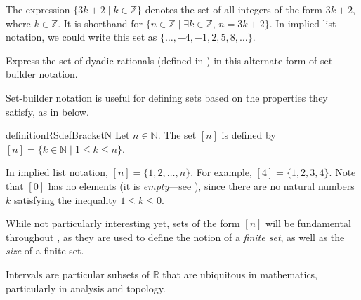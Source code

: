 \begin{example}
The expression $\{ 3k+2 \mid k \in \mathbb{Z} \}$ denotes the set of all integers of the form $3k+2$, where $k \in \mathbb{Z}$. It is shorthand for $\{ n \in \mathbb{Z} \mid \exists k \in \mathbb{Z},\, n=3k+2 \}$. In implied list notation, we could write this set as $\{ \dots, {-4}, {-1}, 2, 5, 8, \dots \}$.
\end{example}

\begin{exercise}
Express the set of dyadic rationals (defined in ) in this alternate form of set-builder notation.
\end{exercise}

Set-builder notation is useful for defining sets based on the properties they satisfy, as in  below.

\begin{restatable}{definition}{RSdefBracketN}
\label{defBracketN}
Let $n \in \mathbb{N}$. The set $[n]$ is defined by $[n] = \{ k \in \mathbb{N} \mid 1 \le k \le n \}$.
\end{restatable}

\begin{example}
\label{exBracketN}
In implied list notation, $[n] = \{ 1, 2, \dots, n \}$. For example, $[4] = \{ 1, 2, 3, 4 \}$. Note that $[0]$ has no elements (it is \textit{empty}---see ), since there are no natural numbers $k$ satisfying the inequality $1 \le k \le 0$.
\end{example}

While not particularly interesting yet, sets of the form $[n]$ will be fundamental throughout , as they are used to define the notion of a \textit{finite set}, as well as the \textit{size} of a finite set.

Intervals are particular subsets of $\mathbb{R}$ that are ubiquitous in mathematics, particularly in analysis and topology.

